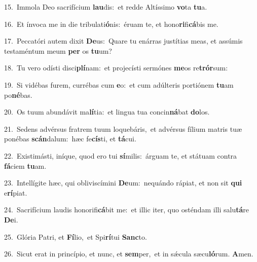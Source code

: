 {\numbfont\textcolor{\numbcolor}{15.}}~Immola Deo sacrifícium \textbf{lau}\-dis:~\star et redde Altíssimo \textbf{vo}\-ta \textbf{tu}\-a.\par
{\numbfont\textcolor{\numbcolor}{16.}}~Et ínvoca me in die tribulati\-\textbf{ó}\-nis:~\star éruam te, et hono\-\textbf{ri}\-fi\-\textbf{cá}\-bis me.\par
{\numbfont\textcolor{\numbcolor}{17.}}~Peccatóri autem dixit \textbf{De}\-us:~\star Quare tu enárras justítias meas, et assúmis testaméntum meum \textbf{per} os \textbf{tu}\-um?\par
{\numbfont\textcolor{\numbcolor}{18.}}~Tu vero odísti disci\-\textbf{plí}\-nam:~\star et projecísti sermónes \textbf{me}\-os re\-\textbf{trór}\-sum:\par
{\numbfont\textcolor{\numbcolor}{19.}}~Si vidébas furem, currébas cum \textbf{e}\-o:~\star et cum adúlteris portiónem \textbf{tu}\-am po\-\textbf{né}\-bas.\par
{\numbfont\textcolor{\numbcolor}{20.}}~Os tuum abundávit ma\-\textbf{lí}\-tia:~\star et lingua tua concin\-\textbf{ná}\-bat \textbf{do}\-los.\par
{\numbfont\textcolor{\numbcolor}{21.}}~Sedens advérsus fratrem tuum loquebáris,~\dagger et advérsus fílium matris tuæ ponébas \textbf{scán}\-dalum:~\star hæc fe\-\textbf{cís}\-ti, et \textbf{tá}\-cui.\par
{\numbfont\textcolor{\numbcolor}{22.}}~Existimásti, iníque, quod ero tui \textbf{sí}\-milis:~\star árguam te, et státuam contra \textbf{fá}\-ciem \textbf{tu}\-am.\par
{\numbfont\textcolor{\numbcolor}{23.}}~Intellígite hæc, qui obliviscímini \textbf{De}\-um:~\star nequándo rápiat, et non sit \textbf{qui} e\-\textbf{rí}\-piat.\par
{\numbfont\textcolor{\numbcolor}{24.}}~Sacrifícium laudis honorifi\-\textbf{cá}\-bit me:~\star et illic iter, quo osténdam illi salu\-\textbf{tá}\-re \textbf{De}\-i.\par
{\numbfont\textcolor{\numbcolor}{25.}}~Glória Patri, et \textbf{Fí}\-lio,~\star et Spi\-\textbf{rí}\-tui \textbf{Sanc}\-to.\par
{\numbfont\textcolor{\numbcolor}{26.}}~Sicut erat in princípio, et nunc, et \textbf{sem}\-per,~\star et in sǽcula sæcu\-\textbf{ló}\-rum. \textbf{A}\-men.\par
